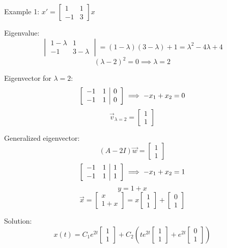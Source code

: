 \documentclass[12pt]{article}
\begin{document}
Example 1: $x' = \begin{bmatrix}
    1 & 1\\
    -1 & 3
\end{bmatrix}x$

Eigenvalue:
\[\begin{vmatrix}
    1 - \lambda & 1\\
    -1 & 3 - \lambda
\end{vmatrix} = (1 - \lambda)(3 - \lambda) + 1 = \lambda^2 -4\lambda + 4\]
\[(\lambda - 2)^2 = 0 \implies \lambda = 2\]

Eigenvector for $\lambda = 2$:
\[\left[\begin{array}{c c | c}
    -1 & 1 & 0\\
    -1 & 1 & 0
\end{array}\right] \implies -x_1 + x_2 = 0\]
\[\vec{v}_{\lambda = 2} = \begin{bmatrix}
    1\\1
\end{bmatrix}\]

Generalized eigenvector:
\[(A - 2I)\vec{w} = \begin{bmatrix}
    1\\1
\end{bmatrix}\]
\[\left[\begin{array}{c c |c}
    -1 & 1 & 1\\
    -1 & 1 & 1
\end{array}\right] \implies -x_1 + x_2 = 1\]
\[y = 1 + x\]
\[\vec{x} = \begin{bmatrix}
    x\\
    1 + x
\end{bmatrix} = x \begin{bmatrix}
    1\\1
\end{bmatrix} + \begin{bmatrix}
    0\\1
\end{bmatrix}\]

Solution:
\[\boxed{x(t) = C_1 e^{2t} \begin{bmatrix}
    1\\1
\end{bmatrix} + C_2\left(te^{2t} \begin{bmatrix}
    1\\1
\end{bmatrix} + e^{2t} \begin{bmatrix}
    0\\1
\end{bmatrix}\right)}\]
\end{document}
